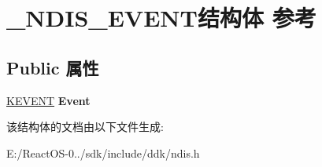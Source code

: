 \hypertarget{struct___n_d_i_s___e_v_e_n_t}{}\section{\+\_\+\+N\+D\+I\+S\+\_\+\+E\+V\+E\+N\+T结构体 参考}
\label{struct___n_d_i_s___e_v_e_n_t}
\subsection*{Public 属性}
\begin{DoxyCompactItemize}
\item 
\mbox{\label{struct___n_d_i_s___e_v_e_n_t_ac5298aad586039cee46a843b1f4f8b73}} 
\hyperlink{struct___k_e_v_e_n_t}{K\+E\+V\+E\+NT} {\bfseries Event}
\end{DoxyCompactItemize}


该结构体的文档由以下文件生成\+:\begin{DoxyCompactItemize}
\item 
E\+:/\+React\+O\+S-\/0../sdk/include/ddk/ndis.\+h\end{DoxyCompactItemize}
